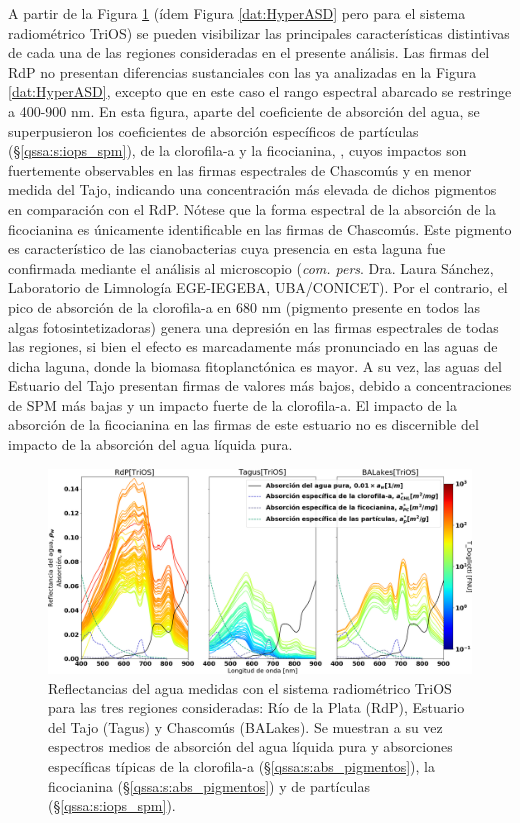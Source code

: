         A partir de la Figura \ref{dat:HyperTriOS} (ídem Figura \ref{dat:HyperASD} pero para el sistema radiométrico TriOS) se pueden visibilizar las principales características distintivas de cada una de las regiones consideradas en el presente análisis. Las firmas del RdP no presentan diferencias sustanciales con las ya analizadas en la Figura \ref{dat:HyperASD}, excepto que en este caso el rango espectral abarcado se restringe a 400-900 nm. En esta figura, aparte del coeficiente de absorción del agua, se superpusieron los coeficientes de absorción específicos de partículas (\S \ref{qssa:s:iops_spm}), de la clorofila-a y la ficocianina, \cite{simis2012}, cuyos impactos son fuertemente observables en las firmas espectrales de Chascomús y en menor medida del Tajo, indicando una concentración más elevada de dichos pigmentos en comparación con el RdP. Nótese que la forma espectral de la absorción de la ficocianina es únicamente identificable en las firmas de Chascomús. Este pigmento es característico de las cianobacterias cuya presencia en esta laguna fue confirmada mediante el análisis al microscopio (\textit{com. pers}. Dra. Laura Sánchez, Laboratorio de Limnología EGE-IEGEBA, UBA/CONICET). Por el contrario, el pico de absorción de la clorofila-a en 680 nm (pigmento presente en todos las algas fotosintetizadoras) genera una depresión en las firmas espectrales de todas las regiones, si bien el efecto es marcadamente más pronunciado en las aguas de dicha laguna, donde la biomasa fitoplanctónica es mayor. A su vez, las aguas del Estuario del Tajo presentan firmas de valores más bajos, debido a concentraciones de SPM más bajas y un impacto fuerte de la clorofila-a. El impacto de la absorción de la ficocianina en las firmas de este estuario no es discernible del impacto de la absorción del agua líquida pura.
    
        \begin{figure}
        \centering
        \includegraphics[width=\textwidth]{dat/figures/HyperTriOS.png}
        \caption[Reflectancias del agua medidas con el sistema radiométrico TriOS para las tres regiones consideradas: Río de la Plata, Estuario del Tajo y Laguna de Chascomús.]{Reflectancias del agua medidas con el sistema radiométrico TriOS para las tres regiones consideradas: Río de la Plata (RdP), Estuario del Tajo (Tagus) y Chascomús (BALakes). Se muestran a su vez espectros medios de absorción del agua líquida pura y absorciones específicas típicas de la clorofila-a (\S \ref{qssa:s:abs_pigmentos}), la ficocianina (\S \ref{qssa:s:abs_pigmentos}) y de partículas (\S \ref{qssa:s:iops_spm}).}
        \label{dat:HyperTriOS}
        \end{figure}


